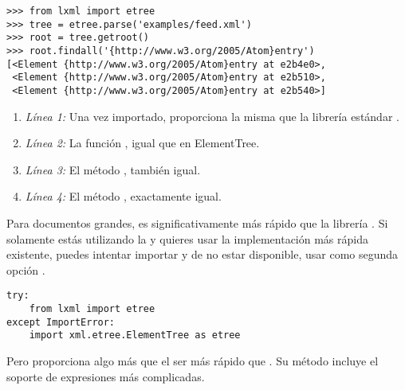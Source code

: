 \noindent\begin{minipage}{\textwidth}
\begin{lstlisting}[mathescape=True]
>>> from lxml import etree
>>> tree = etree.parse('examples/feed.xml')
>>> root = tree.getroot()
>>> root.findall('{http://www.w3.org/2005/Atom}entry')
[<Element {http://www.w3.org/2005/Atom}entry at e2b4e0>,
 <Element {http://www.w3.org/2005/Atom}entry at e2b510>,
 <Element {http://www.w3.org/2005/Atom}entry at e2b540>]
\end{lstlisting}
\end{minipage}

\begin{enumerate}

\item \emph{Línea 1:} Una vez importado,  proporciona la misma  que la librería estándar .

\item \emph{Línea 2:} La función , igual que en ElementTree.

\item \emph{Línea 3:} El método , también igual.

\item \emph{Línea 4:} El método , exactamente igual.

\end{enumerate}

Para documentos  grandes,  es significativamente más rápido que la librería . Si solamente estás utilizando la   y quieres usar la implementación más rápida existente, puedes intentar importar  y de no estar disponible, usar como segunda opción .

\noindent\begin{minipage}{\textwidth}
\begin{lstlisting}[mathescape=True]
try:
    from lxml import etree
except ImportError:
    import xml.etree.ElementTree as etree
\end{lstlisting}
\end{minipage}

Pero  proporciona algo más que el ser más rápido que . Su método  incluye el soporte de expresiones más complicadas.

